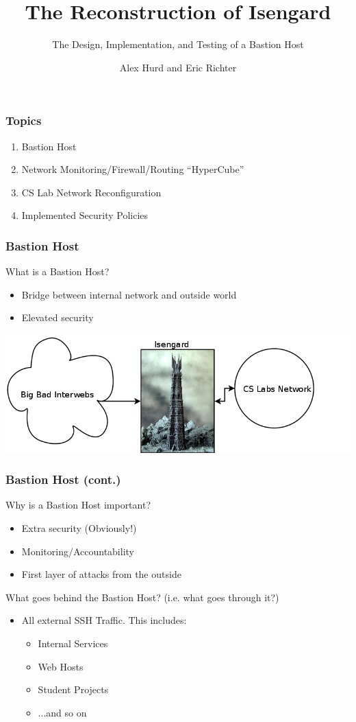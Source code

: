 \documentclass{beamer}
\title{The Reconstruction of Isengard}
\subtitle{The Design, Implementation, and Testing of a Bastion Host}
\author{Alex Hurd and Eric Richter}
\institute[COSI]{Clarkson Open Source Institute}
\begin{document}
\begin{frame}
  \titlepage
\end{frame}

\begin{frame}
  \frametitle{Topics}
  \begin{enumerate}
    \item Bastion Host
    \item Network Monitoring/Firewall/Routing ``HyperCube''
    \item CS Lab Network Reconfiguration
    \item Implemented Security Policies
  \end{enumerate}
\end{frame}

\begin{frame}
  \frametitle{Bastion Host}
What is a Bastion Host?
  \begin{itemize}
    \item Bridge between internal network and outside world
    \item Elevated security
  \end{itemize}
  \includegraphics[width=\textwidth]{diagrams/isengard.png}
\end{frame}

\begin{frame}
  \frametitle{Bastion Host (cont.)}
Why is a Bastion Host important?
  \begin{itemize}
	\item Extra security (Obviously!)
    \item Monitoring/Accountability
    \item First layer of attacks from the outside 
  \end{itemize}
What goes behind the Bastion Host? (i.e. what goes through it?)
  \begin{itemize}
    \item All external SSH Traffic. This includes:
    \begin{itemize}
      \item Internal Services
      \item Web Hosts
      \item Student Projects
      \item ...and so on
    \end{itemize} 
  \end{itemize}
\end{frame}
\end{document}
